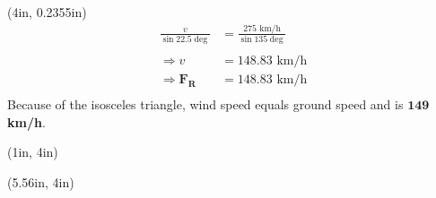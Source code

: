 \documentclass[10pt,oneside]{article}
\def\scale{1}
\begin{document}
\begin{textblock*}{3in}(4in, 0.2355in)
	\large
	\begin{align*}		
		\frac{v}{\sin 22.5\deg}      & = \frac{275\text{ km/h}}{\sin 135\deg} \\\\
		\Rightarrow v                  & = 148.83 \text{ km/h}                    \\
		\Rightarrow  \bm{F_R} & = 148.83 \text{ km/h}                    \\
	\end{align*}
	Because of the isosceles triangle, wind speed equals ground speed and is $\bm{149}$ {\bfseries km/h}.
\end{textblock*}

\begin{textblock*}{4in}(1in, 4in)
\end{textblock*}
\begin{textblock*}{2.25in}(5.56in, 4in)
	\cbox{
		\centering
		\def\scale{0.8}
		
	}
\end{textblock*}
\end{document}
